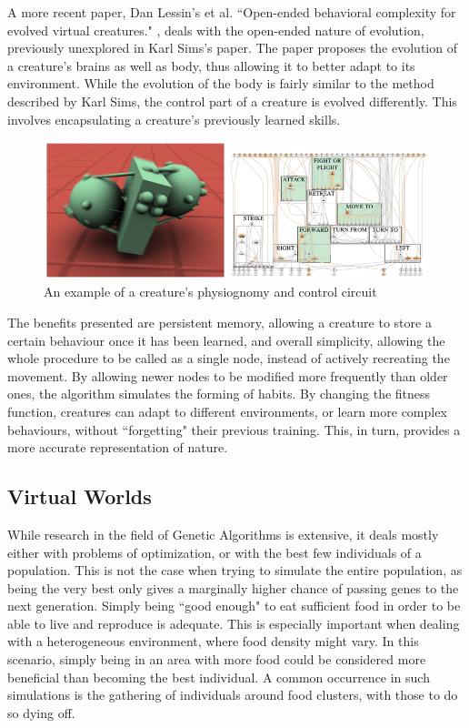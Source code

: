 A more recent paper, Dan Lessin's et al. ``Open-ended behavioral complexity for evolved virtual creatures." \cite{lessin2013open}, deals with the open-ended nature of evolution, previously unexplored in Karl Sims's paper. The paper proposes the evolution of a creature's brains as well as body, thus allowing it to better adapt to its environment. While the evolution of the body is fairly similar to the method described by Karl Sims, the control part of a creature is evolved differently. This involves encapsulating a creature's previously learned skills.
\begin{figure}[!th]
	\centering
	\includegraphics[scale=1]{images/cirtualcreatures}
	\caption{An example of a creature's physiognomy and control circuit}
\end{figure}
The benefits presented are persistent memory, allowing a creature to store a certain behaviour once it has been learned, and overall simplicity, allowing the whole procedure to be called as a single node, instead of actively recreating the movement. By allowing newer nodes to be modified more frequently than older ones, the algorithm simulates the forming of habits. By changing the fitness function, creatures can adapt to different environments, or learn more complex behaviours, without ``forgetting" their previous training. This, in turn, provides a more accurate representation of nature.

\subsection{Virtual Worlds}
While research in the field of Genetic Algorithms is extensive, it deals mostly either with problems of optimization, or with the best few individuals of a population. This is not the case when trying to simulate the entire population, as being the very best only gives a marginally higher chance of passing genes to the next generation. Simply being ``good enough" to eat sufficient food in order to be able to live and reproduce is adequate. This is especially important when dealing with a heterogeneous environment, where food density might vary. In this scenario, simply being in an area with more food could be considered more beneficial than becoming the best individual. A common occurrence in such simulations is the gathering of individuals around food clusters, with those to do so dying off.

